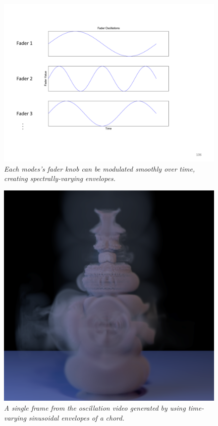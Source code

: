 \begin{figure}[H]
	\centering
	\includegraphics[width=\textwidth]{chap6/figures/fader_envelopes.png}
	\caption{\em Each modes's fader knob can be modulated smoothly over time, creating spectrally-varying envelopes.}
\label{fig:fader_envs}
\end{figure}

\begin{figure}[H]
	\centering
	\includegraphics[width=\textwidth]{chap6/figures/osc.png}
	\caption{\em A single frame from the oscillation video generated by using time-varying sinusoidal envelopes of a chord.}
\label{fig:osc}	
\end{figure}

